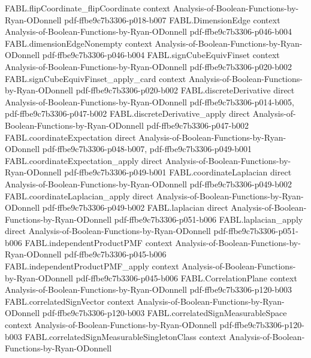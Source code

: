 \begin{theorem}
\proofstep
  {FABL.flipCoordinate_flipCoordinate}
  {context}
  {Analysis-of-Boolean-Functions-by-Ryan-ODonnell}
  {pdf-ffbe9c7b3306-p018-b007}
\proofstep
  {FABL.DimensionEdge}
  {context}
  {Analysis-of-Boolean-Functions-by-Ryan-ODonnell}
  {pdf-ffbe9c7b3306-p046-b004}
\proofstep
  {FABL.dimensionEdgeNonempty}
  {context}
  {Analysis-of-Boolean-Functions-by-Ryan-ODonnell}
  {pdf-ffbe9c7b3306-p046-b004}
\proofstep
  {FABL.signCubeEquivFinset}
  {context}
  {Analysis-of-Boolean-Functions-by-Ryan-ODonnell}
  {pdf-ffbe9c7b3306-p020-b002}
\proofstep
  {FABL.signCubeEquivFinset_apply_card}
  {context}
  {Analysis-of-Boolean-Functions-by-Ryan-ODonnell}
  {pdf-ffbe9c7b3306-p020-b002}
\proofstep
  {FABL.discreteDerivative}
  {direct}
  {Analysis-of-Boolean-Functions-by-Ryan-ODonnell}
  {pdf-ffbe9c7b3306-p014-b005,
    pdf-ffbe9c7b3306-p047-b002}
\proofstep
  {FABL.discreteDerivative_apply}
  {direct}
  {Analysis-of-Boolean-Functions-by-Ryan-ODonnell}
  {pdf-ffbe9c7b3306-p047-b002}
\proofstep
  {FABL.coordinateExpectation}
  {direct}
  {Analysis-of-Boolean-Functions-by-Ryan-ODonnell}
  {pdf-ffbe9c7b3306-p048-b007,
    pdf-ffbe9c7b3306-p049-b001}
\proofstep
  {FABL.coordinateExpectation_apply}
  {direct}
  {Analysis-of-Boolean-Functions-by-Ryan-ODonnell}
  {pdf-ffbe9c7b3306-p049-b001}
\proofstep
  {FABL.coordinateLaplacian}
  {direct}
  {Analysis-of-Boolean-Functions-by-Ryan-ODonnell}
  {pdf-ffbe9c7b3306-p049-b002}
\proofstep
  {FABL.coordinateLaplacian_apply}
  {direct}
  {Analysis-of-Boolean-Functions-by-Ryan-ODonnell}
  {pdf-ffbe9c7b3306-p049-b002}
\proofstep
  {FABL.laplacian}
  {direct}
  {Analysis-of-Boolean-Functions-by-Ryan-ODonnell}
  {pdf-ffbe9c7b3306-p051-b006}
\proofstep
  {FABL.laplacian_apply}
  {direct}
  {Analysis-of-Boolean-Functions-by-Ryan-ODonnell}
  {pdf-ffbe9c7b3306-p051-b006}
\proofstep
  {FABL.independentProductPMF}
  {context}
  {Analysis-of-Boolean-Functions-by-Ryan-ODonnell}
  {pdf-ffbe9c7b3306-p045-b006}
\proofstep
  {FABL.independentProductPMF_apply}
  {context}
  {Analysis-of-Boolean-Functions-by-Ryan-ODonnell}
  {pdf-ffbe9c7b3306-p045-b006}
\proofstep
  {FABL.CorrelationPlane}
  {context}
  {Analysis-of-Boolean-Functions-by-Ryan-ODonnell}
  {pdf-ffbe9c7b3306-p120-b003}
\proofstep
  {FABL.correlatedSignVector}
  {context}
  {Analysis-of-Boolean-Functions-by-Ryan-ODonnell}
  {pdf-ffbe9c7b3306-p120-b003}
\proofstep
  {FABL.correlatedSignMeasurableSpace}
  {context}
  {Analysis-of-Boolean-Functions-by-Ryan-ODonnell}
  {pdf-ffbe9c7b3306-p120-b003}
\proofstep
  {FABL.correlatedSignMeasurableSingletonClass}
  {context}
  {Analysis-of-Boolean-Functions-by-Ryan-ODonnell}

\end{theorem}
